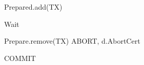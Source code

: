 \begin{algorithm}
\begin{algorithmic}[1]
\EndFor
\State Prepared.add(TX) 


\State Wait
\EndWhile

			Prepare.remove(TX)
			\State \Return ABORT, d.AbortCert
		\EndIf
		
       
\EndFor


\State \Return COMMIT


\end{algorithmic}

\end{algorithm}

